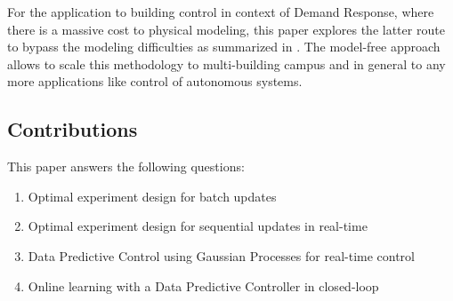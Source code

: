 For the application to building control in context of Demand Response, where there is a massive cost to physical modeling, this paper explores the latter route to bypass the modeling difficulties as summarized in \cite{Sturzenegger2016}. The model-free approach allows to scale this methodology to multi-building campus and in general to any more applications like control of autonomous systems.

\subsection{Contributions}


This paper answers the following questions:
\begin{enumerate}
	\item Optimal experiment design for batch updates
	\item Optimal experiment design for sequential updates in real-time
	\item Data Predictive Control using Gaussian Processes for real-time control
	\item Online learning with a Data Predictive Controller in closed-loop
\end{enumerate}


